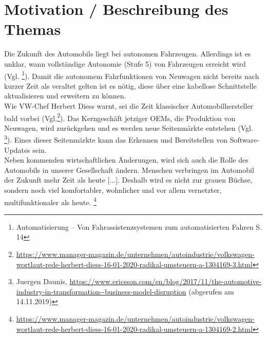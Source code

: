 \documentclass{article}
\begin{document}
\section{Motivation / Beschreibung des Themas}
Die Zukunft des Automobils liegt bei autonomen Fahrzeugen. Allerdings ist es unklar, wann vollständige Autonomie (Stufe 5) von Fahrzeugen erreicht wird (Vgl. \footnote{Automatisierung – Von Fahrassistenzsystemen zum automatisierten Fahren S. 14}). Damit die autonomem Fahrfunktionen von Neuwagen nicht bereits nach kurzer Zeit als veraltet gelten ist es nötig, diese über eine kabellose Schnittstelle aktualisieren und erweitern zu können.\\
Wie VW-Chef Herbert Diess warnt, sei die Zeit klassischer Automobilhersteller bald vorbei (Vgl.\footnote{ \url{https://www.manager-magazin.de/unternehmen/autoindustrie/volkswagen-wortlaut-rede-herbert-diess-16-01-2020-radikal-umsteuern-a-1304169-3.html}}). Das Kerngeschäft jetziger OEMs, die Produktion von Neuwagen, wird zurückgehen und es werden neue Seitenmärkte entstehen (Vgl. \footnote{Juergen Daunis, \url{https://www.ericsson.com/en/blog/2017/11/the-automotive-industry-in-transformation--business-model-disruption} (abgerufen am 14.11.2019)}). Eines dieser Seitenmärkte kann das Erkennen und Bereitstellen von Software-Updates sein.\\
Neben kommenden wirtschaftlichen Änderungen, wird sich auch die Rolle des Automobils in unserer Gesellschaft ändern. Menschen \glqq verbringen im Automobil der Zukunft mehr Zeit als heute [...]. Deshalb wird es nicht zur grauen Büchse, sondern noch viel komfortabler, wohnlicher und vor allem vernetzter, multifunktionaler als heute.\grqq{}  \footnote{\url{https://www.manager-magazin.de/unternehmen/autoindustrie/volkswagen-wortlaut-rede-herbert-diess-16-01-2020-radikal-umsteuern-a-1304169-2.html}}
\end{document}
